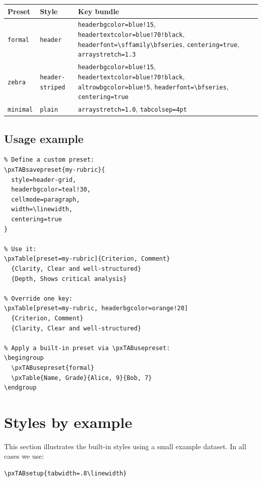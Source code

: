 \documentclass[11pt,a4paper]{article}
\begin{document}
\begin{center}
\begin{tabular}{llp{.48\linewidth}}
\textbf{Preset} & \textbf{Style} & \textbf{Key bundle}\\\hline
\texttt{formal} & \texttt{header} &
  \texttt{headerbgcolor=blue!15},
  \texttt{headertextcolor=blue!70!black},
  \texttt{headerfont=\textbackslash sffamily\textbackslash bfseries},
  \texttt{centering=true}, \texttt{arraystretch=1.3}\\
\texttt{zebra} & \texttt{header-striped} &
  \texttt{headerbgcolor=blue!15},
  \texttt{headertextcolor=blue!70!black},
  \texttt{altrowbgcolor=blue!5},
  \texttt{headerfont=\textbackslash bfseries},
  \texttt{centering=true}\\
\texttt{minimal} & \texttt{plain} &
  \texttt{arraystretch=1.0}, \texttt{tabcolsep=4pt}\\
\end{tabular}
\end{center}

\subsection{Usage example}

\begin{verbatim}
% Define a custom preset:
\pxTABsavepreset{my-rubric}{
  style=header-grid,
  headerbgcolor=teal!30,
  cellmode=paragraph,
  width=\linewidth,
  centering=true
}

% Use it:
\pxTable[preset=my-rubric]{Criterion, Comment}
  {Clarity, Clear and well-structured}
  {Depth, Shows critical analysis}

% Override one key:
\pxTable[preset=my-rubric, headerbgcolor=orange!20]
  {Criterion, Comment}
  {Clarity, Clear and well-structured}

% Apply a built-in preset via \pxTABusepreset:
\begingroup
  \pxTABusepreset{formal}
  \pxTable{Name, Grade}{Alice, 9}{Bob, 7}
\endgroup
\end{verbatim}

\section{Styles by example}

This section illustrates the built-in styles using a small example
dataset.  In all cases we use:

\begin{verbatim}
\pxTABsetup{tabwidth=.8\linewidth}
\end{verbatim}
\end{document}
